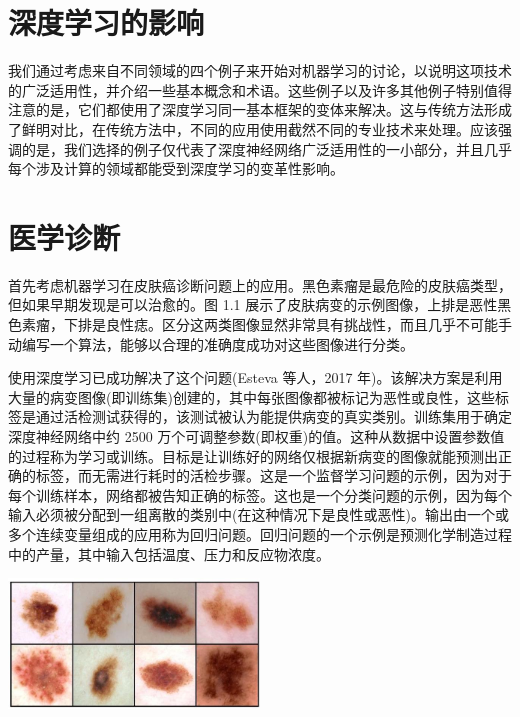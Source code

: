 \documentclass[10pt]{report}
\begin{document}
\section{深度学习的影响}

我们通过考虑来自不同领域的四个例子来开始对机器学习的讨论，以说明这项技术的广泛适用性，并介绍一些基本概念和术语。这些例子以及许多其他例子特别值得注意的是，它们都使用了深度学习同一基本框架的变体来解决。这与传统方法形成了鲜明对比，在传统方法中，不同的应用使用截然不同的专业技术来处理。应该强调的是，我们选择的例子仅代表了深度神经网络广泛适用性的一小部分，并且几乎每个涉及计算的领域都能受到深度学习的变革性影响。

\section{医学诊断}

首先考虑机器学习在皮肤癌诊断问题上的应用。黑色素瘤是最危险的皮肤癌类型，但如果早期发现是可以治愈的。图 1.1 展示了皮肤病变的示例图像，上排是恶性黑色素瘤，下排是良性痣。区分这两类图像显然非常具有挑战性，而且几乎不可能手动编写一个算法，能够以合理的准确度成功对这些图像进行分类。

使用深度学习已成功解决了这个问题(Esteva 等人，2017 年)。该解决方案是利用大量的病变图像(即训练集)创建的，其中每张图像都被标记为恶性或良性，这些标签是通过活检测试获得的，该测试被认为能提供病变的真实类别。训练集用于确定深度神经网络中约 2500 万个可调整参数(即权重)的值。这种从数据中设置参数值的过程称为学习或训练。目标是让训练好的网络仅根据新病变的图像就能预测出正确的标签，而无需进行耗时的活检步骤。这是一个监督学习问题的示例，因为对于每个训练样本，网络都被告知正确的标签。这也是一个分类问题的示例，因为每个输入必须被分配到一组离散的类别中(在这种情况下是良性或恶性)。输出由一个或多个连续变量组成的应用称为回归问题。回归问题的一个示例是预测化学制造过程中的产量，其中输入包括温度、压力和反应物浓度。

\begin{center}
\includegraphics[max width=0.5\textwidth]{images/0194e279-9b28-703a-88f4-c3ac21e2010d_21_871_1649_671_348_0.jpg}
\end{center}
\hspace*{3em} 
\end{document}
